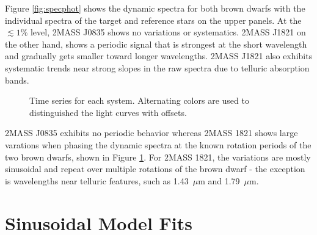 \documentclass[twocolumn]{aastex6}
\begin{document}
Figure \ref{fig:specphot} shows the dynamic spectra for both brown dwarfs with the individual spectra of the target and reference stars on the upper panels.
At the $\lesssim 1$\% level, 2MASS J0835 shows no variations or systematics.
2MASS J1821 on the other hand, shows a periodic signal that is strongest at the short wavelength and gradually gets smaller toward longer wavelengths.
2MASS J1821 also exhibits systematic trends near strong slopes in the raw spectra due to telluric absorption bands.

\begin{figure}[!t]
\centering
{}
	\caption{Time series for each system. Alternating colors are used to distinguished the light curves with offsets.}
	\label{fig:tserPfold}
\end{figure} 

2MASS J0835 exhibits no periodic behavior whereas 2MASS 1821 shows large varations when phasing the dynamic spectra at the known rotation periods of the two brown dwarfs, shown in Figure \ref{fig:tserPfold}.
For 2MASS 1821, the variations are mostly sinusoidal and repeat over multiple rotations of the brown dwarf - the exception is wavelengths near telluric features, such as 1.43~$\mu$m and 1.79~$\mu$m.


\section{Sinusoidal Model Fits}\label{sec:ModelFits}
\end{document}
